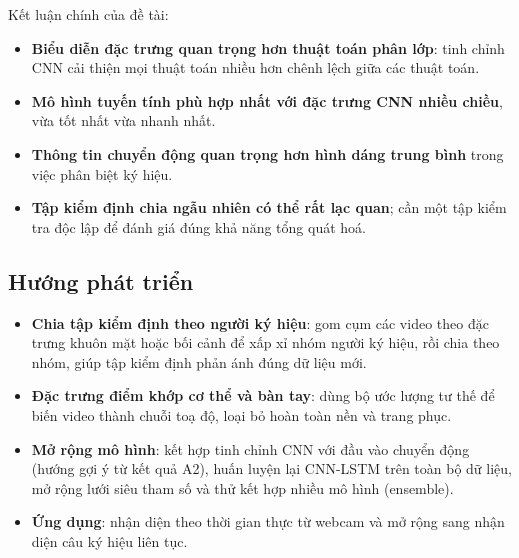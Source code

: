 Kết luận chính của đề tài:
\begin{itemize}
  \item \textbf{Biểu diễn đặc trưng quan trọng hơn thuật toán phân lớp}: tinh chỉnh CNN cải thiện mọi thuật toán nhiều hơn chênh lệch giữa các thuật toán.
  \item \textbf{Mô hình tuyến tính phù hợp nhất với đặc trưng CNN nhiều chiều}, vừa tốt nhất vừa nhanh nhất.
  \item \textbf{Thông tin chuyển động quan trọng hơn hình dáng trung bình} trong việc phân biệt ký hiệu.
  \item \textbf{Tập kiểm định chia ngẫu nhiên có thể rất lạc quan}; cần một tập kiểm tra độc lập để đánh giá đúng khả năng tổng quát hoá.
\end{itemize}

\subsection{Hướng phát triển}

\begin{itemize}
  \item \textbf{Chia tập kiểm định theo người ký hiệu}: gom cụm các video theo đặc trưng khuôn mặt hoặc bối cảnh để xấp xỉ nhóm người ký hiệu, rồi chia theo nhóm, giúp tập kiểm định phản ánh đúng dữ liệu mới.
  \item \textbf{Đặc trưng điểm khớp cơ thể và bàn tay}: dùng bộ ước lượng tư thế để biến video thành chuỗi toạ độ, loại bỏ hoàn toàn nền và trang phục.
  \item \textbf{Mở rộng mô hình}: kết hợp tinh chỉnh CNN với đầu vào chuyển động (hướng gợi ý từ kết quả A2), huấn luyện lại CNN-LSTM trên toàn bộ dữ liệu, mở rộng lưới siêu tham số và thử kết hợp nhiều mô hình (ensemble).
  \item \textbf{Ứng dụng}: nhận diện theo thời gian thực từ webcam và mở rộng sang nhận diện câu ký hiệu liên tục.
\end{itemize}
